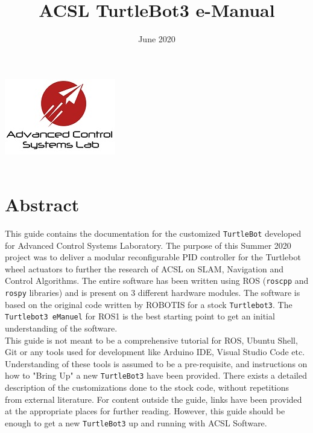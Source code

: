 \documentclass[12]{article}
\title{ACSL TurtleBot3 e-Manual}
\date{June 2020}
\begin{document}
\makeatletter
    \begin{titlepage}
        \begin{center}
            \includegraphics[width=0.7\linewidth]{images/ACSL_Logo.jpg}\\[4ex]
            {\huge \bfseries  \@title }\\[52ex]  
            {\large \@date}
        \end{center}
    \end{titlepage}
\makeatother

\tableofcontents
\newpage
\section*{Abstract}
This guide contains the documentation for the customized \texttt{TurtleBot} developed for Advanced Control Systems Laboratory. The purpose of this Summer 2020 project was to deliver a modular reconfigurable PID controller for the Turtlebot wheel actuators to further the research of ACSL on SLAM, Navigation and Control Algorithms. The entire software has been written using ROS (\texttt{roscpp} and \texttt{rospy} libraries) and is present on 3 different hardware modules. The software is based on the original code written by ROBOTIS for a stock \texttt{Turtlebot3}. The \texttt{Turtlebot3 eManuel} for ROS1 is the best starting point to get an initial understanding of the software.\\
This guide is not meant to be a comprehensive tutorial for ROS, Ubuntu Shell, Git or any tools used for development like Arduino IDE, Visual Studio Code etc. Understanding of these tools is assumed to be a pre-requisite, and instructions on how to "Bring Up" a new \texttt{TurtleBot3} have been provided. There exists a detailed description of the customizations done to the stock code, without repetitions from external literature. For content outside the guide, links have been provided at the appropriate places for further reading. However, this guide should be enough to get a new \texttt{TurtleBot3} up and running with ACSL Software.
\newpage
\end{document}
